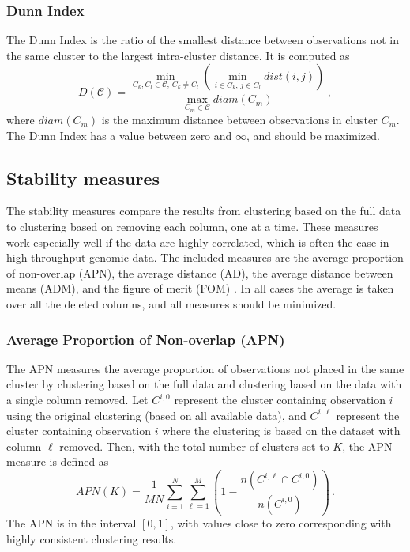 \documentclass[11pt]{article}
\begin{document}
\subsubsection*{Dunn Index}

The Dunn Index is the ratio of the smallest distance between
observations not in the same cluster to the largest intra-cluster
distance.  It is computed as 
$$
D(\mathcal{C}) = \frac{\min\limits_{C_k, C_l \in \mathcal{C}, \,C_k
    \neq C_l} \left(\min\limits_{i\in C_k, \,j\in C_l} dist(i,j)\right)}{\max\limits_{C_m \in \mathcal{C}}
    diam(C_m)} \,,
$$
where $diam(C_m)$ is the maximum distance between observations in
cluster $C_m$.
The Dunn Index has a value between zero and $\infty$, and should be maximized.




\subsection{Stability measures}
\label{subsec:stability}

The stability measures compare the results from clustering based on
the full data to clustering based on removing each column, one at a time.
These measures work especially well if the data are highly
correlated, which is often the case in high-throughput genomic data. 
The included measures are the average proportion of non-overlap (APN),
the average distance (AD), the average distance between means (ADM),
and the figure of merit (FOM) \citep{Dat2003, Yeu2001}.    
In all cases the average is taken over all the
deleted columns, and all measures should be minimized.  

\subsubsection*{Average Proportion of Non-overlap (APN)}

The APN measures the average proportion of observations not placed in the
same cluster by clustering based on the full data and clustering based
on the data with a single column removed.  
Let $C^{i,0}$ represent the cluster
containing observation $i$ using the original clustering (based on all available
data), and $C^{i,\ell}$ represent the cluster containing observation
$i$ where the clustering is based on the dataset with column $\ell$
removed.  %
Then, with the total number of clusters set to $K$, the
APN measure is defined as 
$$
APN(K) = \frac{1}{MN}\sum\limits_{i=1}^N\sum\limits_{\ell=1}^M \left( 1 -
  \frac{n(C^{i,\ell} \cap C^{i,0})}{n(C^{i,0})} \right) \,.
$$
The APN is in the interval $[0,1]$, with values close to zero
corresponding with highly consistent clustering results.
\end{document}
